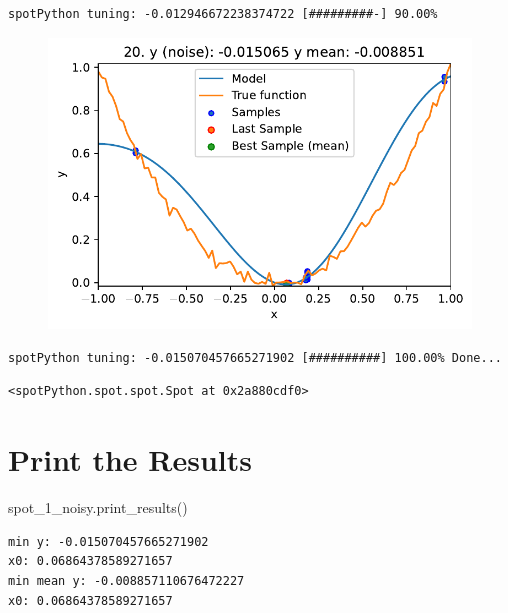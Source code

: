 \documentclass[
  letterpaper,
  DIV=11,
  numbers=noendperiod]{scrreprt}
\newenvironment{Shaded}{\begin{snugshade}}{\end{snugshade}}
\newcommand{\NormalTok}[1]{\textcolor[rgb]{0.00,0.23,0.31}{#1}}
\begin{document}
\begin{verbatim}
spotPython tuning: -0.012946672238374722 [#########-] 90.00% 
\end{verbatim}

\begin{figure}[H]

{\centering \includegraphics{08_spot_noisy_files/figure-pdf/cell-6-output-14.pdf}

}

\end{figure}

\begin{verbatim}
spotPython tuning: -0.015070457665271902 [##########] 100.00% Done...
\end{verbatim}

\begin{verbatim}
<spotPython.spot.spot.Spot at 0x2a880cdf0>
\end{verbatim}

\hypertarget{print-the-results-3}{%
\section{Print the Results}\label{print-the-results-3}}

\begin{Shaded}
\begin{Highlighting}[]
\NormalTok{spot\_1\_noisy.print\_results()}
\end{Highlighting}
\end{Shaded}

\begin{verbatim}
min y: -0.015070457665271902
x0: 0.06864378589271657
min mean y: -0.008857110676472227
x0: 0.06864378589271657
\end{verbatim}
\end{document}
